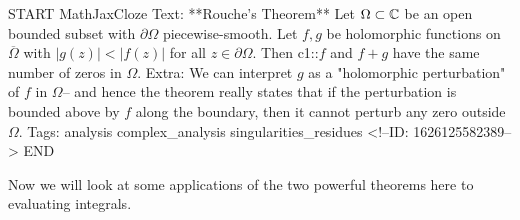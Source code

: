 \documentclass{memoir}
\begin{document}
\begin{anki}
START
MathJaxCloze
Text: **Rouche's Theorem**
Let \(\Omega \subset \mathbb{C}\) be an open bounded subset with \(\partial \Omega \) piecewise-smooth. Let \(f,g\) be holomorphic functions on \(\overline{\Omega }\) with \(\left| g(z) \right| < \left| f(z) \right| \) for all \(z \in \partial\Omega \). Then {{c1::\(f\) and \(f+g\) have the same number of zeros in \(\Omega \)}}.
Extra: We can interpret \(g\) as a "holomorphic perturbation" of \(f\) in \(\Omega \)-- and hence the theorem really states that if the perturbation is bounded above by \(f\) along the boundary, then it cannot perturb any zero outside \(\Omega \).
Tags: analysis complex_analysis singularities_residues
<!--ID: 1626125582389-->
END
\end{anki}

Now we will look at some applications of the two powerful theorems here to evaluating integrals.

\end{document}
